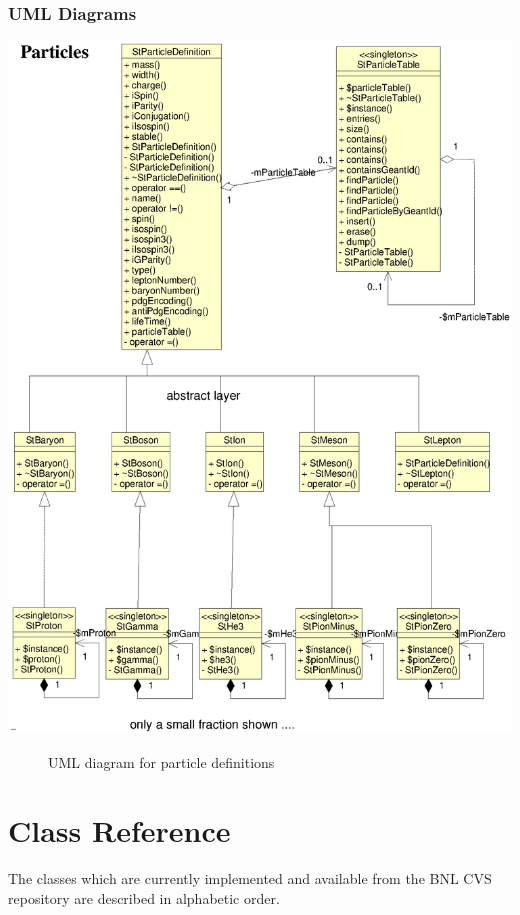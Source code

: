 \documentclass[twoside]{article}
\begin{document}
\subsubsection{UML Diagrams}
\label{sec:umlPart}
\begin{center}
    \includegraphics[height=0.85\textheight]{umlParticles.eps}
\end{center}
\begin{figure}[h]    
    \caption{UML diagram for particle definitions}
    \label{fig:umlPart}
\end{figure}

\clearpage


  
\section{Class Reference}
The classes which are currently implemented and available from the
BNL CVS repository are described in alphabetic order.
\clearpage
\end{document}
